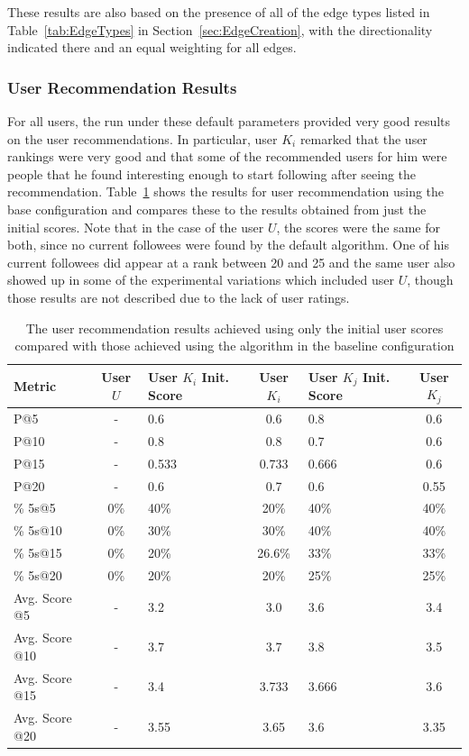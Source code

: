 These results are also based on the presence of all of the edge types listed in Table~\ref{tab:EdgeTypes} in Section~\ref{sec:EdgeCreation}, with the directionality indicated there and an equal weighting for all edges.


\subsubsection{User Recommendation Results}

For all users, the run under these default parameters provided very good results on the user recommendations. In particular, user $K_{i}$ remarked that the user rankings were very good and that some of the recommended users for him were people that he found interesting enough to start following after seeing the recommendation. Table~\ref{tab:BaseUserResults} shows the results for user recommendation using the base configuration and compares these to the results obtained from just the initial scores. Note that in the case of the user $U$, the scores were the same for both, since no current followees were found by the default algorithm. One of his current followees did appear at a rank between 20 and 25 and the same user also showed up in some of the experimental variations which included user $U$, though those results are not described due to the lack of user ratings.


\begin{table}
\centering
\begin{tabular}{l|c|p{2.25cm}|c|p{2.25cm}|c}
{\bf Metric} & {\bf User $U$} & {\bf User $K_{i}$ Init. Score} & {\bf User $K_{i}$} & {\bf User $K_{j}$ Init. Score} & {\bf User $K_{j}$} \\ \hline
P@5   & - & 0.6 & 0.6 & 0.8 & 0.6 \\ \hline
P@10 & - & 0.8 & 0.8 & 0.7 & 0.6 \\ \hline
P@15 & - & 0.533 & 0.733 & 0.666 & 0.6 \\ \hline
P@20 & - & 0.6 & 0.7 & 0.6 & 0.55 \\ \hline

\% 5s@5    & 0\% & 40\% & 20\% & 40\% & 40\% \\ \hline
\% 5s@10  & 0\% & 30\% & 30\% & 40\% & 40\% \\ \hline
\% 5s@15  & 0\% & 20\% & 26.6\% & 33\% & 33\% \\ \hline
\% 5s@20  & 0\% & 20\% & 20\% & 25\% & 25\% \\ \hline

Avg. Score @5   & - & 3.2 & 3.0 & 3.6 & 3.4 \\ \hline
Avg. Score @10 & - & 3.7 & 3.7 & 3.8 & 3.5 \\ \hline
Avg. Score @15 & - & 3.4 & 3.733 & 3.666 & 3.6 \\ \hline
Avg. Score @20 & - & 3.55 & 3.65 & 3.6 & 3.35 \\
\end{tabular}
\caption[User recommendation results for the baseline configuration]{The user recommendation results achieved using only the initial user scores compared with those achieved using the algorithm in the baseline configuration}
\label{tab:BaseUserResults}
\end{table}



